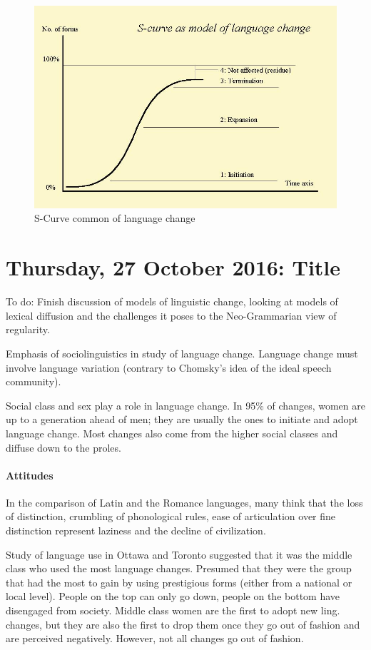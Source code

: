\documentclass{exam}
\begin{document}
\begin{figure} [h!]
    \centering
    \includegraphics[scale=.4]{images/s_curve.JPG}
    \caption{S-Curve common of language change}
    \label{fig:my_label}
\end{figure}



\section*{Thursday, 27 October 2016: Title}

To do: Finish discussion of models of linguistic change, looking at models of lexical diffusion and the challenges it poses to the Neo-Grammarian view of regularity. 

Emphasis of sociolinguistics in study of language change. Language change must involve language variation (contrary to Chomsky's idea of the ideal speech community). 

Social class and sex play a role in language change. In 95\% of changes, women are up to a generation ahead of men; they are usually the ones to initiate and adopt language change. Most changes also come from the higher social classes and diffuse down to the proles. 

\paragraph{Attitudes} In the comparison of Latin and the Romance languages, many think that the loss of distinction, crumbling of phonological rules, ease of articulation over fine distinction represent laziness and the decline of civilization. 

Study of language use in Ottawa and Toronto suggested that it was the middle class who used the most language changes. Presumed that they were the group that had the most to gain by using prestigious forms (either from a national or local level). People on the top can only go down, people on the bottom have disengaged from society. Middle class women are the first to adopt new ling. changes, but they are also the first to drop them once they go out of fashion and are perceived negatively. However, not all changes go out of fashion. 
\end{document}
